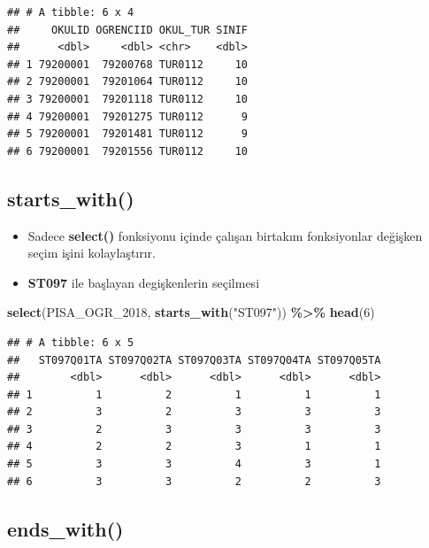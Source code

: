 \documentclass[
  oneside]{book}
\newenvironment{Shaded}{\begin{snugshade}}{\end{snugshade}}
\newcommand{\DecValTok}[1]{\textcolor[rgb]{0.00,0.00,0.81}{#1}}
\newcommand{\FunctionTok}[1]{\textcolor[rgb]{0.13,0.29,0.53}{\textbf{#1}}}
\newcommand{\NormalTok}[1]{#1}
\newcommand{\SpecialCharTok}[1]{\textcolor[rgb]{0.81,0.36,0.00}{\textbf{#1}}}
\newcommand{\StringTok}[1]{\textcolor[rgb]{0.31,0.60,0.02}{#1}}
\begin{document}
\begin{verbatim}
## # A tibble: 6 x 4
##     OKULID OGRENCIID OKUL_TUR SINIF
##      <dbl>     <dbl> <chr>    <dbl>
## 1 79200001  79200768 TUR0112     10
## 2 79200001  79201064 TUR0112     10
## 3 79200001  79201118 TUR0112     10
## 4 79200001  79201275 TUR0112      9
## 5 79200001  79201481 TUR0112      9
## 6 79200001  79201556 TUR0112     10
\end{verbatim}

\hypertarget{starts_with}{%
\subsection{\texorpdfstring{\textbf{starts\_with()}}{starts\_with()}}\label{starts_with}}

\begin{itemize}
\item
  Sadece \textbf{select()} fonksiyonu içinde çalışan birtakım fonksiyonlar değişken seçim işini kolaylaştırır.
\item
  \textbf{ST097} ile başlayan degişkenlerin seçilmesi
\end{itemize}

\begin{Shaded}
\begin{Highlighting}[]
\FunctionTok{select}\NormalTok{(PISA\_OGR\_2018, }\FunctionTok{starts\_with}\NormalTok{(}\StringTok{"ST097"}\NormalTok{)) }\SpecialCharTok{\%\textgreater{}\%} \FunctionTok{head}\NormalTok{(}\DecValTok{6}\NormalTok{)}
\end{Highlighting}
\end{Shaded}

\begin{verbatim}
## # A tibble: 6 x 5
##   ST097Q01TA ST097Q02TA ST097Q03TA ST097Q04TA ST097Q05TA
##        <dbl>      <dbl>      <dbl>      <dbl>      <dbl>
## 1          1          2          1          1          1
## 2          3          2          3          3          3
## 3          2          3          3          3          3
## 4          2          2          3          1          1
## 5          3          3          4          3          1
## 6          3          3          2          2          3
\end{verbatim}

\hypertarget{ends_with}{%
\subsection{\texorpdfstring{\textbf{ends\_with()}}{ends\_with()}}\label{ends_with}}
\end{document}

